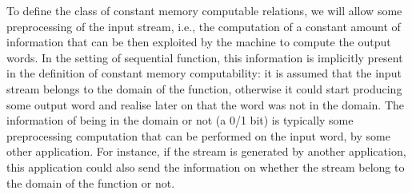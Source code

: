 \documentclass[envcountsame]{llncs}
\begin{document}
To define the class of constant memory computable relations, we will
allow some preprocessing of the input stream, i.e., the computation of 
a constant amount of information that can be then exploited by the
machine to compute the output words. In the setting of sequential
function, this information is implicitly present in the definition of
constant memory computability: it is assumed that the input stream belongs to the domain
of the function, otherwise it could start producing some output word
and realise later on that the word was not in the domain. The
information of being in the domain or not (a 0/1 bit) is typically some
preprocessing computation that can be performed on the input word, by
some other application. For instance, if the stream is generated by
another application, this application could also send the information
on whether the stream belong to the domain of the function or not. 
\end{document}
